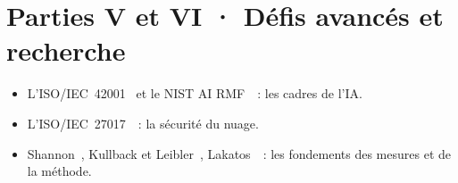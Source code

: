 \section*{Parties V et VI · Défis avancés et recherche}

\begin{itemize}
    \item L'ISO/IEC~42001~\cite{iso42001_2023} et le NIST AI RMF~\cite{nist2023airmf}~:
          les cadres de l'IA.
    \item L'ISO/IEC~27017~\cite{iso27017_2015}~: la sécurité du nuage.
    \item Shannon~\cite{shannon1948}, Kullback et Leibler~\cite{kullback1951},
          Lakatos~\cite{lakatos1970}~: les fondements des mesures et de la
          méthode.
\end{itemize}
